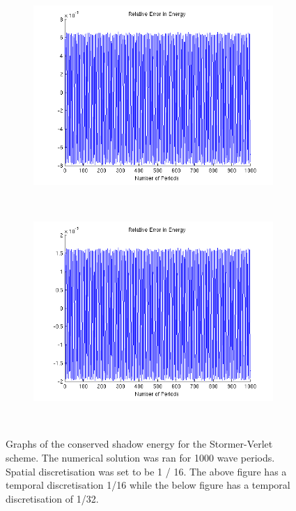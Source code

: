 \documentclass[a4paper,11pt]{article}
\begin{document}
\begin{figure}
    \centering
    \begin{subfigure}[b]{0.75\textwidth}
        \includegraphics[width=\textwidth]{error2.png}
            \end{subfigure}
    ~ %
    \begin{subfigure}[b]{0.75\textwidth}
        \includegraphics[width=\textwidth]{error3.png}
                \end{subfigure}
    ~ %
  
    \caption{Graphs of the conserved shadow energy for the Stormer-Verlet scheme. The numerical solution was ran for 1000 wave periods. Spatial  discretisation was set to be 1 / 16. The above figure has a temporal discretisation 1/16 while the below figure has a temporal discretisation of 1/32. }\label{fig:animals}
      \label{test2}
\end{figure}
\end{document}

